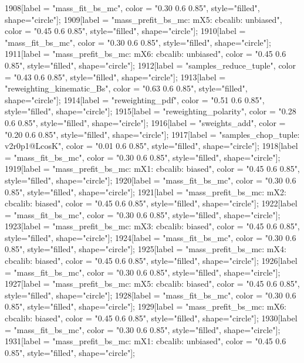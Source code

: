 {	1908[label = "mass_fit_bs_mc", color = "0.30 0.6 0.85", style="filled", shape="circle"];
	1909[label = "mass_prefit_bs_mc\nmassbin: mX5\nmassmodel: cbcalib\ntrigger: unbiased", color = "0.45 0.6 0.85", style="filled", shape="circle"];
	1910[label = "mass_fit_bs_mc", color = "0.30 0.6 0.85", style="filled", shape="circle"];
	1911[label = "mass_prefit_bs_mc\nmassbin: mX6\nmassmodel: cbcalib\ntrigger: unbiased", color = "0.45 0.6 0.85", style="filled", shape="circle"];
	1912[label = "samples_reduce_tuple", color = "0.43 0.6 0.85", style="filled", shape="circle"];
	1913[label = "reweighting_kinematic_Bs", color = "0.63 0.6 0.85", style="filled", shape="circle"];
	1914[label = "reweighting_pdf", color = "0.51 0.6 0.85", style="filled", shape="circle"];
	1915[label = "reweighting_polarity", color = "0.28 0.6 0.85", style="filled", shape="circle"];
	1916[label = "sweights_add", color = "0.20 0.6 0.85", style="filled", shape="circle"];
	1917[label = "samples_chop_tuple\nversion: v2r0p1@LcosK", color = "0.01 0.6 0.85", style="filled", shape="circle"];
	1918[label = "mass_fit_bs_mc", color = "0.30 0.6 0.85", style="filled", shape="circle"];
	1919[label = "mass_prefit_bs_mc\nmassbin: mX1\nmassmodel: cbcalib\ntrigger: biased", color = "0.45 0.6 0.85", style="filled", shape="circle"];
	1920[label = "mass_fit_bs_mc", color = "0.30 0.6 0.85", style="filled", shape="circle"];
	1921[label = "mass_prefit_bs_mc\nmassbin: mX2\nmassmodel: cbcalib\ntrigger: biased", color = "0.45 0.6 0.85", style="filled", shape="circle"];
	1922[label = "mass_fit_bs_mc", color = "0.30 0.6 0.85", style="filled", shape="circle"];
	1923[label = "mass_prefit_bs_mc\nmassbin: mX3\nmassmodel: cbcalib\ntrigger: biased", color = "0.45 0.6 0.85", style="filled", shape="circle"];
	1924[label = "mass_fit_bs_mc", color = "0.30 0.6 0.85", style="filled", shape="circle"];
	1925[label = "mass_prefit_bs_mc\nmassbin: mX4\nmassmodel: cbcalib\ntrigger: biased", color = "0.45 0.6 0.85", style="filled", shape="circle"];
	1926[label = "mass_fit_bs_mc", color = "0.30 0.6 0.85", style="filled", shape="circle"];
	1927[label = "mass_prefit_bs_mc\nmassbin: mX5\nmassmodel: cbcalib\ntrigger: biased", color = "0.45 0.6 0.85", style="filled", shape="circle"];
	1928[label = "mass_fit_bs_mc", color = "0.30 0.6 0.85", style="filled", shape="circle"];
	1929[label = "mass_prefit_bs_mc\nmassbin: mX6\nmassmodel: cbcalib\ntrigger: biased", color = "0.45 0.6 0.85", style="filled", shape="circle"];
	1930[label = "mass_fit_bs_mc", color = "0.30 0.6 0.85", style="filled", shape="circle"];
	1931[label = "mass_prefit_bs_mc\nmassbin: mX1\nmassmodel: cbcalib\ntrigger: unbiased", color = "0.45 0.6 0.85", style="filled", shape="circle"];
}
